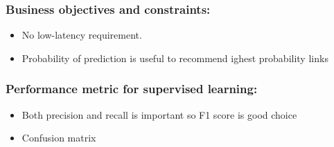 \documentclass[11pt]{article}
\providecommand{\tightlist}{%
      \setlength{\itemsep}{0pt}\setlength{\parskip}{0pt}}
\begin{document}
    \subsubsection{Business objectives and
constraints:}\label{business-objectives-and-constraints}

\begin{itemize}
\tightlist
\item
  No low-latency requirement.
\item
  Probability of prediction is useful to recommend ighest probability
  links
\end{itemize}

    \subsubsection{Performance metric for supervised
learning:}\label{performance-metric-for-supervised-learning}

\begin{itemize}
\tightlist
\item
  Both precision and recall is important so F1 score is good choice
\item
  Confusion matrix
\end{itemize}
\end{document}
